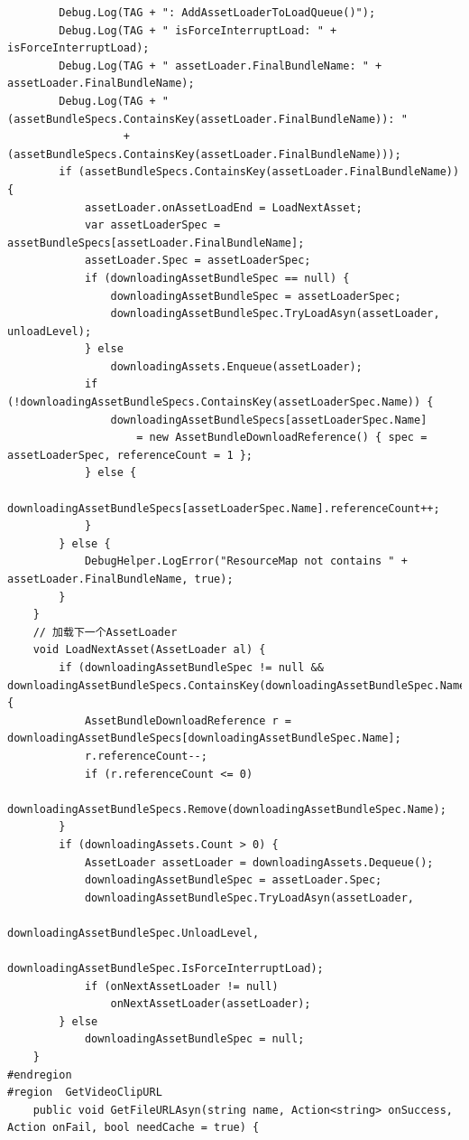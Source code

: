 \documentclass[9pt, b5paper]{article}
\begin{document}
\begin{verbatim}
        Debug.Log(TAG + ": AddAssetLoaderToLoadQueue()");
        Debug.Log(TAG + " isForceInterruptLoad: " + isForceInterruptLoad); 
        Debug.Log(TAG + " assetLoader.FinalBundleName: " + assetLoader.FinalBundleName);
        Debug.Log(TAG + " (assetBundleSpecs.ContainsKey(assetLoader.FinalBundleName)): "
                  + (assetBundleSpecs.ContainsKey(assetLoader.FinalBundleName)));
        if (assetBundleSpecs.ContainsKey(assetLoader.FinalBundleName)) {
            assetLoader.onAssetLoadEnd = LoadNextAsset;
            var assetLoaderSpec = assetBundleSpecs[assetLoader.FinalBundleName];
            assetLoader.Spec = assetLoaderSpec;
            if (downloadingAssetBundleSpec == null) {
                downloadingAssetBundleSpec = assetLoaderSpec;
                downloadingAssetBundleSpec.TryLoadAsyn(assetLoader, unloadLevel);
            } else 
                downloadingAssets.Enqueue(assetLoader);
            if (!downloadingAssetBundleSpecs.ContainsKey(assetLoaderSpec.Name)) {
                downloadingAssetBundleSpecs[assetLoaderSpec.Name]
                    = new AssetBundleDownloadReference() { spec = assetLoaderSpec, referenceCount = 1 };
            } else {
                downloadingAssetBundleSpecs[assetLoaderSpec.Name].referenceCount++;
            }
        } else {
            DebugHelper.LogError("ResourceMap not contains " + assetLoader.FinalBundleName, true);
        }
    }
    // 加载下一个AssetLoader
    void LoadNextAsset(AssetLoader al) {
        if (downloadingAssetBundleSpec != null && downloadingAssetBundleSpecs.ContainsKey(downloadingAssetBundleSpec.Name)) {
            AssetBundleDownloadReference r = downloadingAssetBundleSpecs[downloadingAssetBundleSpec.Name];
            r.referenceCount--;
            if (r.referenceCount <= 0) 
                downloadingAssetBundleSpecs.Remove(downloadingAssetBundleSpec.Name);
        }
        if (downloadingAssets.Count > 0) {
            AssetLoader assetLoader = downloadingAssets.Dequeue();
            downloadingAssetBundleSpec = assetLoader.Spec;
            downloadingAssetBundleSpec.TryLoadAsyn(assetLoader,
                                                   downloadingAssetBundleSpec.UnloadLevel,
                                                   downloadingAssetBundleSpec.IsForceInterruptLoad);
            if (onNextAssetLoader != null) 
                onNextAssetLoader(assetLoader);
        } else 
            downloadingAssetBundleSpec = null;
    }
#endregion
#region  GetVideoClipURL
    public void GetFileURLAsyn(string name, Action<string> onSuccess, Action onFail, bool needCache = true) {

\end{verbatim}
\end{document}

